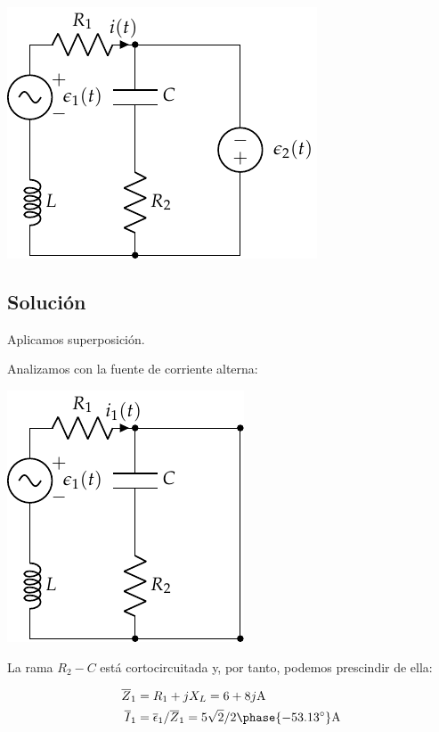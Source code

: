 \begin{center}
  \includegraphics{figuras/superposicion1_ej.pdf}
\end{center}

 \subsection*{Solución}

Aplicamos superposición.

Analizamos con la fuente de corriente alterna:

\begin{center}
\includegraphics{figuras/superposicion1_AC}
\end{center}

La rama $R_2 - C$ está cortocircuitada y, por tanto, podemos prescindir de ella:

\begin{align*}
  \overline{Z}_1 &= R_1 + jX_L = 6 + 8j\si{\ampere}\\
  \overline{I}_1 &= \overline{\epsilon}_1 / \overline{Z}_1 = 5\sqrt{2}/2\phase{\ang{-53.13}}\si{\ampere}
\end{align*}

